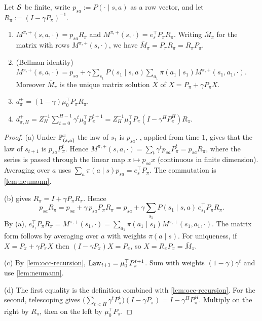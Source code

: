\begin{proposition}\label{prop:occ-resolvent}
Let $\mathcal{S}$ be finite, write $p_{sa}:=P(\cdot\mid s,a)$ as a row vector, and let $R_\pi:=(I-\gamma P_\pi)^{-1}$.
\begin{enumerate}[nosep,label=(\alph*)]
\item $M^{\pi,+}(s,a,\cdot)=p_{sa}R_\pi$ and $M^{\pi,+}(s,\cdot)=e_s^\top P_\pi R_\pi$.
  Writing $\bar M_\pi$ for the matrix with rows $M^{\pi,+}(s,\cdot)$, we have $\bar M_\pi=P_\pi R_\pi=R_\pi P_\pi$.
\item (Bellman identity)
  $M^{\pi,+}(s,a,\cdot)=p_{sa}+\gamma\sum_{s_1}P(s_1\mid s,a)\sum_{a_1}\pi(a_1\mid s_1)M^{\pi,+}(s_1,a_1,\cdot)$.
  Moreover $\bar M_\pi$ is the unique matrix solution $X$ of $X=P_\pi+\gamma P_\pi X$.
\item $d^+_\pi=(1-\gamma)\mu_0^\top P_\pi R_\pi$.
\item $d^+_{\pi,H}=Z_H^{-1}\sum_{t=0}^{H-1}\gamma^t\mu_0^\top P_\pi^{t+1}=Z_H^{-1}\mu_0^\top P_\pi(I-\gamma^HP_\pi^H)R_\pi$.
\end{enumerate}
\end{proposition}
\begin{proof}
(a) Under $\mathbb{P}^\pi_{(s,a)}$ the law of $s_1$ is $p_{sa}$.
, applied from time $1$, gives that the law of $s_{t+1}$ is $p_{sa}P_\pi^t$.
Hence $M^{\pi,+}(s,a,\cdot)=\sum_t\gamma^tp_{sa}P_\pi^t=p_{sa}R_\pi$, where the series is passed through the linear map $x\mapsto p_{sa}x$ (continuous in finite dimension).
Averaging over $a$ uses $\sum_a\pi(a\mid s)p_{sa}=e_s^\top P_\pi$.
The commutation is \cref{lem:neumann}.

(b)  gives $R_\pi=I+\gamma P_\pi R_\pi$. Hence
\[
p_{sa}R_\pi=p_{sa}+\gamma\,p_{sa}P_\pi R_\pi=p_{sa}+\gamma\sum_{s_1}P(s_1\mid s,a)\,e_{s_1}^\top P_\pi R_\pi .
\]
By (a), $e_{s_1}^\top P_\pi R_\pi=M^{\pi,+}(s_1,\cdot)=\sum_{a_1}\pi(a_1\mid s_1)M^{\pi,+}(s_1,a_1,\cdot)$.
The matrix form follows by averaging over $a$ with weights $\pi(a\mid s)$.
For uniqueness, if $X=P_\pi+\gamma P_\pi X$ then $(I-\gamma P_\pi)X=P_\pi$, so $X=R_\pi P_\pi=\bar M_\pi$.

(c) By \cref{lem:occ-recursion}, $\mathrm{Law}_{t+1}=\mu_0^\top P_\pi^{t+1}$.
Sum with weights $(1-\gamma)\gamma^t$ and use \cref{lem:neumann}.

(d) The first equality is the definition combined with \cref{lem:occ-recursion}.
For the second, telescoping gives $\big(\sum_{t<H}\gamma^tP_\pi^t\big)(I-\gamma P_\pi)=I-\gamma^HP_\pi^H$.
Multiply on the right by $R_\pi$, then on the left by $\mu_0^\top P_\pi$.
\end{proof}

